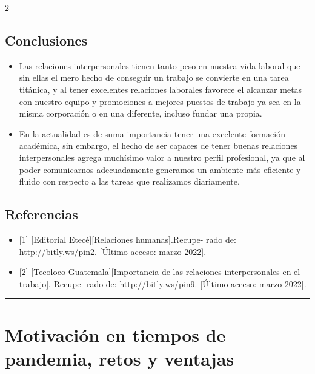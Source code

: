 \documentclass[12pt,spanish,Letterpaper,openany]{book}
\newcommand{\HRule}{\begin{center}\rule{0.5\linewidth}{0.2mm}\end{center}}
\begin{document}
\begin {multicols}{2}
\hypertarget{conclusiones-8}{%
\section*{Conclusiones}\label{conclusiones-8}}

\begin{itemize}
\item
  Las relaciones interpersonales tienen tanto peso en nuestra vida laboral que sin ellas el mero hecho de conseguir un trabajo se convierte en una tarea titánica, y al tener excelentes relaciones laborales favorece el alcanzar metas con nuestro equipo y promociones a mejores puestos de trabajo ya sea en la misma corporación o en una diferente, incluso fundar una propia.
\item
  En la actualidad es de suma importancia tener una excelente formación académica, sin embargo, el hecho de ser capaces de tener buenas relaciones interpersonales agrega muchísimo valor a nuestro perfil profesional, ya que al poder comunicarnos adecuadamente generamos un ambiente más eficiente y fluido con respecto a las tareas que realizamos diariamente.
\end{itemize}

\hypertarget{referencias-13}{%
\section*{Referencias}\label{referencias-13}}

\begin{itemize}
\item
  {[}1{]} {[}Editorial Etecé{]}{[}Relaciones humanas{]}.Recupe-
  rado de: \url{http://bitly.ws/pin2}. {[}Último acceso: marzo 2022{]}.
\item
  {[}2{]} {[}Tecoloco Guatemala{]}{[}Importancia de las relaciones interpersonales en el trabajo{]}. Recupe-
  rado de: \url{http://bitly.ws/pin9}. {[}Último acceso: marzo 2022{]}.
\end{itemize}

\end {multicols}
\medskip
\HRule
\medskip

\hypertarget{pareja19}{%
\chapter{Motivación en tiempos de pandemia, retos y ventajas}\label{pareja19}}
\end{document}
